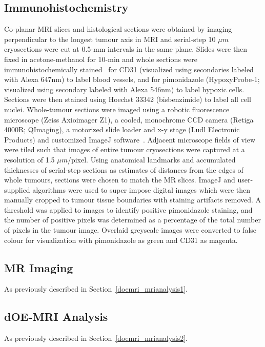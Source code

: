 \subsection{Immunohistochemistry}
\label{doemri_histo}
Co-planar MRI slices and histological sections were obtained by imaging perpendicular to the longest tumour axis in MRI and serial-step 10 $\mu m$ cryosections were cut at 0.5-mm intervals in the same plane.
Slides were then fixed in acetone-methanol for 10-min and whole sections were immunohistochemically stained~\cite{Kalra:2017is} for \acs{CD31} (visualized using secondaries labeled with Alexa 647nm) to label blood vessels, and for pimonidazole (HypoxyProbe-1; visualized using secondary labeled with Alexa 546nm) to label hypoxic cells. 
Sections were then stained using Hoechst 33342 (bisbenzimide) to label all cell nuclei.
Whole-tumour sections were imaged using a robotic fluorescence microscope (Zeiss Axioimager Z1), a cooled, monochrome CCD camera (Retiga 4000R; QImaging), a motorized slide loader and x-y stage (Ludl Electronic Products) and customized ImageJ software~\cite{Collins:2007jr}. 
Adjacent microscope fields of view were tiled such that images of entire tumour cryosections were captured at a resolution of 1.5 $\mu m$/pixel. 
Using anatomical landmarks and accumulated thicknesses of serial-step sections as estimates of distances from the edges of whole tumours, sections were chosen to match the MR slices. 
ImageJ and user-supplied algorithms were used to super impose digital images which were then manually cropped to tumour tissue boundaries with staining artifacts removed. 
A threshold was applied to images to identify positive pimonidazole staining, and the number of positive pixels was determined as a percentage of the total number of pixels in the tumour image. 
Overlaid greyscale images were converted to false colour for visualization with pimonidazole as green and \acs{CD31} as magenta.

\subsection{MR Imaging}
As previously described in Section~\ref{doemri_mrianalysis1}.

\subsection{\acs{dOE-MRI} Analysis}

As previously described in Section~\ref{doemri_mrianalysis2}.

